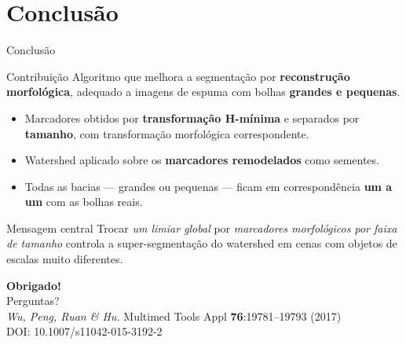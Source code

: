 \documentclass[aspectratio=169,12pt]{beamer}
\newcommand{\artigo}{\textit{Wu, Peng, Ruan \& Hu.} Multimed Tools Appl \textbf{76}:19781--19793 (2017)}
\begin{document}
\section{Conclusão}
\begin{frame}{Conclusão}
  \begin{block}{Contribuição}
    Algoritmo que melhora a segmentação por \textbf{reconstrução morfológica},
    adequado a imagens de espuma com bolhas \textbf{grandes e pequenas}.
  \end{block}
  \begin{itemize}
    \item Marcadores obtidos por \textbf{transformação H-mínima} e separados por
      \textbf{tamanho}, com transformação morfológica correspondente.
    \item Watershed aplicado sobre os \textbf{marcadores remodelados} como sementes.
    \item Todas as bacias --- grandes ou pequenas --- ficam em correspondência
      \textbf{um a um} com as bolhas reais.
  \end{itemize}
  \begin{exampleblock}{Mensagem central}
    Trocar \emph{um limiar global} por \emph{marcadores morfológicos por faixa de
    tamanho} controla a super-segmentação do watershed em cenas com objetos de
    escalas muito diferentes.
  \end{exampleblock}
\end{frame}

\begin{frame}[plain]
  \centering
  \vspace{1.2cm}
  {\color{white}\Large\bfseries Obrigado!}\\[0.3cm]
  {\color{white} Perguntas?}\\[1.2cm]
  \small
  \artigo\\
  DOI: 10.1007/s11042-015-3192-2
\end{frame}
\end{document}
